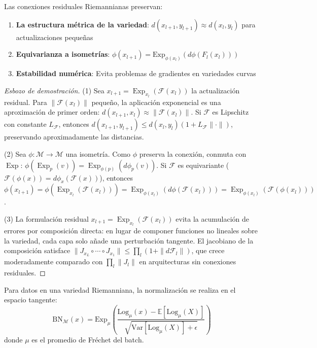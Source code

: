 \begin{theorem}
Las conexiones residuales Riemannianas preservan:
\begin{enumerate}
	\item \textbf{La estructura métrica de la variedad}: \(d(x_{l+1}, y_{l+1}) \approx d(x_l, y_l)\) para actualizaciones pequeñas
	\item \textbf{Equivarianza a isometrías}: \(\phi(x_{l+1}) = \text{Exp}_{\phi(x_l)}(d\phi(F_l(x_l)))\)
	\item \textbf{Estabilidad numérica}: Evita problemas de gradientes en variedades curvas
\end{enumerate}
\end{theorem}

\begin{proof}[Esbozo de demostración]
(1) Sea $x_{l+1} = \operatorname{Exp}_{x_l}(\mathcal{F}(x_l))$ la actualización residual. Para $\|\mathcal{F}(x_l)\|$ pequeño, la aplicación exponencial es una aproximación de primer orden: $d(x_{l+1}, x_l) \approx \|\mathcal{F}(x_l)\|$. Si $\mathcal{F}$ es Lipschitz con constante $L_\mathcal{F}$, entonces $d(x_{l+1}, y_{l+1}) \leq d(x_l, y_l)(1 + L_\mathcal{F} \|\cdot\|)$, preservando aproximadamente las distancias.

(2) Sea $\phi: \mathcal{M} \to \mathcal{M}$ una isometría. Como $\phi$ preserva la conexión, conmuta con $\operatorname{Exp}$: $\phi(\operatorname{Exp}_p(v)) = \operatorname{Exp}_{\phi(p)}(d\phi_p(v))$. Si $\mathcal{F}$ es equivariante ($\mathcal{F}(\phi(x)) = d\phi_x(\mathcal{F}(x))$), entonces $\phi(x_{l+1}) = \phi(\operatorname{Exp}_{x_l}(\mathcal{F}(x_l))) = \operatorname{Exp}_{\phi(x_l)}(d\phi(\mathcal{F}(x_l))) = \operatorname{Exp}_{\phi(x_l)}(\mathcal{F}(\phi(x_l)))$.

(3) La formulación residual $x_{l+1} = \operatorname{Exp}_{x_l}(\mathcal{F}(x_l))$ evita la acumulación de errores por composición directa: en lugar de componer funciones no lineales sobre la variedad, cada capa solo añade una perturbación tangente. El jacobiano de la composición satisface $\|J_{x_{L}} \circ \cdots \circ J_{x_1}\| \leq \prod_l (1 + \|d\mathcal{F}_l\|)$, que crece moderadamente comparado con $\prod_l \|J_l\|$ en arquitecturas sin conexiones residuales.
\end{proof}

\begin{definition}
Para datos en una variedad Riemanniana, la normalización se realiza en el espacio tangente:
\[
\text{BN}_\mathcal{M}(x) = \text{Exp}_{\mu} \left( \frac{\text{Log}_\mu(x) - \mathbb{E}[\text{Log}_\mu(X)]}{\sqrt{\text{Var}[\text{Log}_\mu(X)] + \epsilon}} \right)
\]
donde \(\mu\) es el promedio de Fréchet del batch.
\end{definition}

